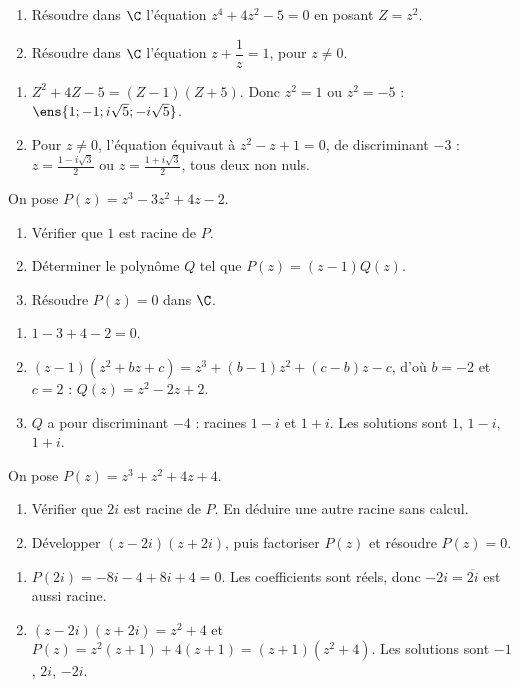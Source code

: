 \begin{exercise}
\begin{enumerate}
\item Résoudre dans $\C$ l'équation $z^4+4z^2-5=0$ en posant $Z=z^2$.
\item Résoudre dans $\C$ l'équation $z+\dfrac1z=1$, pour $z\neq0$.
\end{enumerate}
\end{exercise}
\begin{solution}
\begin{enumerate}
\item $Z^2+4Z-5=(Z-1)(Z+5)$. Donc $z^2=1$ ou $z^2=-5$ : $\ens{1;-1;i\sqrt5;-i\sqrt5}$.
\item Pour $z\neq0$, l'équation équivaut à $z^2-z+1=0$, de discriminant $-3$ : $z=\frac{1-i\sqrt3}2$ ou $z=\frac{1+i\sqrt3}2$, tous deux non nuls.
\end{enumerate}
\end{solution}

\begin{exercise}
On pose $P(z)=z^3-3z^2+4z-2$.
\begin{enumerate}
\item Vérifier que $1$ est racine de $P$.
\item Déterminer le polynôme $Q$ tel que $P(z)=(z-1)Q(z)$.
\item Résoudre $P(z)=0$ dans $\C$.
\end{enumerate}
\end{exercise}
\begin{solution}
\begin{enumerate}
\item $1-3+4-2=0$.
\item $(z-1)\left(z^2+bz+c\right)=z^3+(b-1)z^2+(c-b)z-c$, d'où $b=-2$ et $c=2$ : $Q(z)=z^2-2z+2$.
\item $Q$ a pour discriminant $-4$ : racines $1-i$ et $1+i$. Les solutions sont $1$, $1-i$, $1+i$.
\end{enumerate}
\end{solution}

\begin{exercise}
On pose $P(z)=z^3+z^2+4z+4$.
\begin{enumerate}
\item Vérifier que $2i$ est racine de $P$. En déduire une autre racine sans calcul.
\item Développer $(z-2i)(z+2i)$, puis factoriser $P(z)$ et résoudre $P(z)=0$.
\end{enumerate}
\end{exercise}
\begin{solution}
\begin{enumerate}
\item $P(2i)=-8i-4+8i+4=0$. Les coefficients sont réels, donc $-2i=\overline{2i}$ est aussi racine.
\item $(z-2i)(z+2i)=z^2+4$ et $P(z)=z^2(z+1)+4(z+1)=(z+1)\left(z^2+4\right)$. Les solutions sont $-1$, $2i$, $-2i$.
\end{enumerate}
\end{solution}


